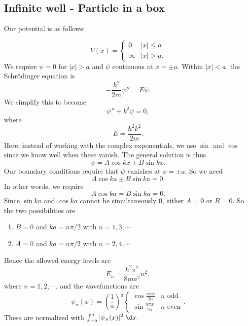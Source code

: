 \documentclass[a4paper]{article}
\begin{document}
\subsection{Infinite well - Particle in a box}
Our potential is as follows:
\begin{center}
\end{center}
\[
  V(x) =
  \begin{cases}
    0 & |x| \leq a\\
    \infty & |x| > a.
  \end{cases}
\]
We require $\psi = 0$ for $|x| > a$ and $\psi$ continuous at $x = \pm a$. Within $|x| < a$, the Schr\"odinger equation is
\[
  -\frac{\hbar^2}{2m}\psi'' = E\psi.
\]
We simplify this to become
\[
  \psi'' + k^2 \psi = 0,
\]
where
\[
  E = \frac{\hbar^2 k^2}{2m}.
\]
Here, instead of working with the complex exponentials, we use $\sin$ and $\cos$ since we know well when these vanish. The general solution is thus
\[
  \psi = A\cos kx + B\sin kx.
\]
Our boundary conditions require that $\psi$ vanishes at $x = \pm a$. So we need
\[
  A \cos ka \pm B\sin ka = 0.
\]
In other words, we require
\[
  A\cos ka = B\sin ka = 0.
\]
Since $\sin ka$ and $\cos ka$ cannot be simultaneously $0$, either $A = 0$ or $B = 0$. So the two possibilities are
\begin{enumerate}
  \item $B = 0$ and $ka = n\pi/2$ with $n = 1, 3, \cdots$
  \item $A = 0$ and $ka = n\pi/2$ with $n = 2, 4, \cdots$
\end{enumerate}
Hence the allowed energy levels are
\[
  E_n = \frac{\hbar^2 \pi^2}{8ma^2} n^2,
\]
where $n = 1, 2, \cdots$, and the wavefunctions are
\[
  \psi_n(x) = \left(\frac{1}{a}\right)^{\frac{1}{2}}
  \begin{cases}
    \cos \frac{n\pi x}{2a} & n\text{ odd}\\
    \sin \frac{n\pi x}{2a} & n\text{ even}
  \end{cases}.
\]
These are normalized with $\int_{-a}^a |\psi_n(x)|^2 \;\d x$.
\end{document}
